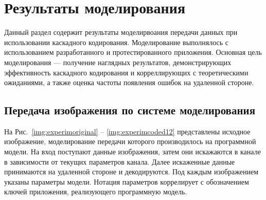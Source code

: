 \chapter{Результаты моделирования}
Данный раздел содержит результаты моделирвоания передачи данных при использовании каскадного
кодирования. Моделирование выполнялось с использованием разработанного и протестированного
приложения. Основная цель моделирования --- получение наглядных результатов, демонстрирующих
эффективность каскадного кодирования и корреллирующих с теоретическими ожиданиями, а также
оценка частоты появления ошибок на удаленной стороне.

\section{Передача изображения по системе моделирования}
На Рис.~\ref{img:experimoriginal} -- \ref{img:experimcoded12} представлены исходное изображение, моделирование передачи которого
производилось на программной модели. На вход поступают данные изображения, затем они искажаются в канале
в зависимости от текущих параметров канала. Далее искаженные данные принимаются на удаленной стороне и
декодируются. Под каждым изображением указаны параметры модели. Нотация параметров коррелирует с обозначением
ключей приложения, реализующего программную модель.

